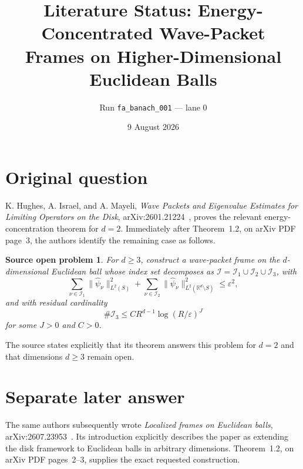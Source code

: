 \documentclass[11pt]{article}
\title{Literature Status: Energy-Concentrated Wave-Packet\\
Frames on Higher-Dimensional Euclidean Balls}
\author{Run \texttt{fa\_banach\_001} --- lane 0}
\date{9 August 2026}
\newtheorem*{question}{Source open problem}
\begin{document}
\maketitle

\begin{center}
\end{center}

\section{Original question}

K. Hughes, A. Israel, and A. Mayeli,
\emph{Wave Packets and Eigenvalue Estimates for Limiting Operators on the
Disk}, arXiv:2601.21224~\cite{disk}, proves the relevant energy-concentration
theorem for $d=2$.  Immediately after Theorem~1.2, on arXiv PDF page~3, the
authors identify the remaining case as follows.

\begin{question}
For $d\geq3$, construct a wave-packet frame on the $d$-dimensional Euclidean
ball whose index set decomposes as
$\mathcal I=\mathcal I_1\cup\mathcal I_2\cup\mathcal I_3$, with
\[
 \sum_{\nu\in\mathcal I_1}\|\widehat\psi_\nu\|_{L^2(S)}^2
 +\sum_{\nu\in\mathcal I_2}
   \|\widehat\psi_\nu\|_{L^2(\mathbb R^d\setminus S)}^2
 \leq \varepsilon^2,
\]
and with residual cardinality
\[
 \#\mathcal I_3\leq C R^{d-1}\log(R/\varepsilon)^J
\]
for some $J>0$ and $C>0$.
\end{question}

The source states explicitly that its theorem answers this problem for
$d=2$ and that dimensions $d\geq3$ remain open.

\section{Separate later answer}

The same authors subsequently wrote
\emph{Localized frames on Euclidean balls}, arXiv:2607.23953~\cite{balls}.
Its introduction explicitly describes the paper as extending the disk
framework to Euclidean balls in arbitrary dimensions.  Theorem~1.2, on arXiv
PDF pages~2--3, supplies the exact requested construction.
\end{document}
